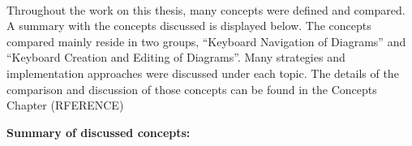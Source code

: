 \paragraph{}
Throughout the work on this thesis, many concepts were defined and compared. A summary with the concepts discussed is displayed below. The concepts compared mainly reside in two groups, ``Keyboard Navigation of Diagrams'' and ``Keyboard Creation and Editing of Diagrams''. Many strategies and implementation approaches were discussed under each topic. The details of the comparison and discussion of those concepts can be found in the Concepts Chapter (RFERENCE)

\begin{spacing}{2}\end{spacing}
\par \noindent
{\bf Summary of discussed concepts:}
